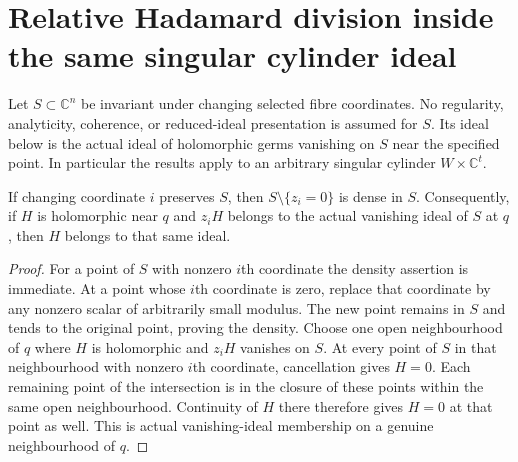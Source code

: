\section{Relative Hadamard division inside the same singular cylinder ideal}

Let $S\subset\mathbb C^n$ be invariant under changing selected fibre coordinates.
No regularity, analyticity, coherence, or reduced-ideal presentation is assumed
for $S$. Its ideal below is the actual ideal of holomorphic germs vanishing on
$S$ near the specified point. In particular the results apply to an arbitrary
singular cylinder $W\times\mathbb C^t$.

\begin{lemma}
\label{hir:actual-cylinder-coordinate-division-ideal}
\leanok
If changing coordinate $i$ preserves $S$, then $S\setminus\{z_i=0\}$ is dense
in $S$. Consequently, if $H$ is holomorphic near $q$ and $z_iH$ belongs to the
actual vanishing ideal of $S$ at $q$, then $H$ belongs to that same ideal.
\end{lemma}
\begin{proof}
For a point of $S$ with nonzero $i$th coordinate the density assertion is
immediate. At a point whose $i$th coordinate is zero, replace that coordinate
by any nonzero scalar of arbitrarily small modulus. The new point remains in
$S$ and tends to the original point, proving the density. Choose one open
neighbourhood of $q$ where $H$ is holomorphic and $z_iH$ vanishes on $S$.
At every point of $S$ in that neighbourhood with nonzero $i$th coordinate,
cancellation gives $H=0$. Each remaining point of the intersection is in the
closure of these points within the same open neighbourhood. Continuity of
$H$ there therefore gives $H=0$ at that point as well. This is actual
vanishing-ideal membership on a genuine neighbourhood of $q$.
\end{proof}

